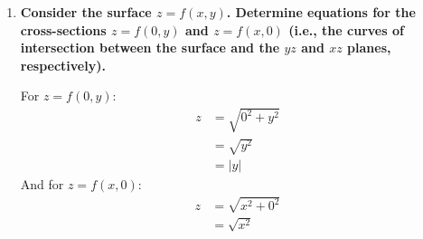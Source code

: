 \documentclass[11pt]{article}
\begin{document}
\begin{enumerate}[label=\textbf{\arabic*.}]
{\begin{enumerate}[label=\textbf{(\alph*)}]
{\begin{center}
                    \end{center}
                }
                \item{
                    \label{part:1c}
                    \textbf{\boldmath Consider the surface \(z=f(x,y)\). Determine equations for the cross-sections \(z=f(0,y)\) and \(z=f(x,0)\) (i.e., the curves of intersection between the surface and the \(yz\) and \(xz\) planes, respectively).}
                    \par
                    For \(z=f(0,y)\):
                    \begin{align*}
                        z&=\sqrt{0^2+y^2} \\
                        &=\sqrt{y^2} \\
                        &=|y|
                    \end{align*}
                    And for \(z=f(x,0)\):
                    \begin{align*}
                        z&=\sqrt{x^2+0^2} \\
                        &=\sqrt{x^2} \\

\end{align*}}
\end{enumerate}}
\end{enumerate}
\end{document}
